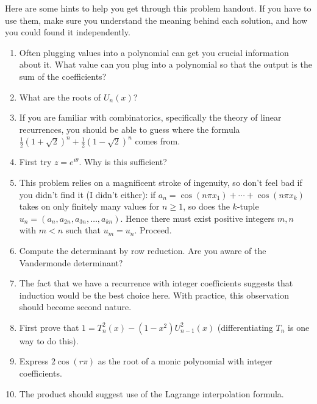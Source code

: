 \documentclass{article}
\theoremstyle{definition}
\theoremstyle{remark}
\newcommand{\geqs}{\geqslant}
\begin{document}
Here are some hints to help you get through this problem handout. If you have to use them, make sure you understand the meaning behind each solution, and how you could found it independently.
\begin{enumerate}[label=\textbf{\arabic*.}]
    \item Often plugging values into a polynomial can get you crucial information about it. What value can you plug into a polynomial so that the output is the sum of the coefficients?
    \item What are the roots of $U_n(x)$?
    \item If you are familiar with combinatorics, specifically the theory of linear recurrences, you should be able to guess where the formula $\frac{1}{2}(1+\sqrt{2})^n+\frac{1}{2}(1-\sqrt{2})^n$ comes from.
    \item First try $z=e^{i\theta}$. Why is this sufficient?
    \item This problem relies on a magnificent stroke of ingenuity, so don't feel bad if you didn't find it (I didn't either): if $a_n=\cos(n\pi x_1)+\cdots +\cos(n\pi x_k)$ takes on only finitely many values for $n\geqs 1$, so does the $k$-tuple $u_n=(a_n,a_{2n},a_{3n},\dots,a_{kn})$. Hence there must exist positive integers $m,n$ with $m<n$ such that $u_m=u_n$. Proceed.
    \item Compute the determinant by row reduction. Are you aware of the Vandermonde determinant?
    \item The fact that we have a recurrence with integer coefficients suggests that induction would be the best choice here. With practice, this observation should become second nature.
    \item First prove that $1=T_n^2(x)-(1-x^2)U_{n-1}^2(x)$ (differentiating $T_n$ is one way to do this).
    \item Express $2\cos(r\pi)$ as the root of a monic polynomial with integer coefficients.
    \item The product should suggest use of the Lagrange interpolation formula.
\end{enumerate}
\end{document}
